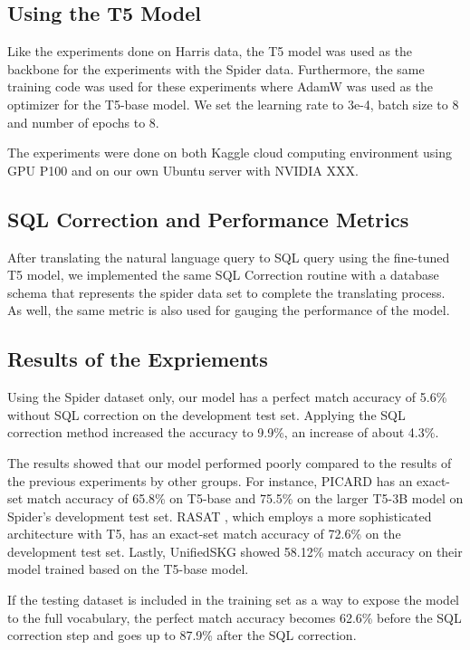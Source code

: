 \documentclass[conference]{IEEEtran}
\begin{document}
\subsection{Using the T5 Model}
Like the experiments done on Harris data, the T5 model was used as the backbone for the experiments with the Spider data. Furthermore, the same training code was used for these experiments where AdamW was used as the optimizer for the T5-base model. We set the learning rate to 3e-4, batch size to 8 and number of epochs to 8.  

The experiments were done on both Kaggle cloud computing environment using GPU P100 and on our own Ubuntu server with NVIDIA XXX.


\subsection{SQL Correction and Performance Metrics}
After translating the natural language query to SQL query using the fine-tuned T5 model, we implemented the same SQL Correction routine with a database schema that represents the spider data set to complete the translating process. As well, the same metric is also used for gauging the performance of the model.

\subsection{Results of the Expriements}
Using the Spider dataset only, our model has a perfect match accuracy of 5.6\% without SQL correction on the development test set. Applying the SQL correction method increased the accuracy to 9.9\%, an increase of about 4.3\%.

The results showed that our model performed poorly compared to the results of the previous experiments by other groups. For instance, PICARD \cite{Scholak2021PICARD:Models} has an exact-set match accuracy of 65.8\% on T5-base and 75.5\% on the larger T5-3B model on Spider’s development test set. RASAT \cite{Qi2022RASAT:Text-to-SQL}, which employs a more sophisticated architecture with T5, has an exact-set match accuracy of 72.6\% on the development test set. Lastly, UnifiedSKG \cite{Xie2022UnifiedSKG:Models} showed 58.12\% match accuracy on their model trained based on the T5-base model.

If the testing dataset is included in the training set as a way to expose the model to the full vocabulary, the perfect match accuracy becomes 62.6\% before the SQL correction step and goes up to 87.9\% after the SQL correction.
\end{document}
